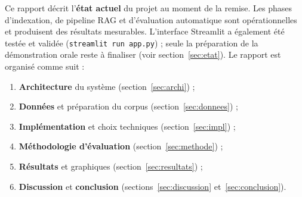 Ce rapport d\'ecrit l'\textbf{\'etat actuel} du projet au moment de la remise. Les phases
d'indexation, de pipeline RAG et d'\'evaluation automatique sont op\'erationnelles et produisent
des r\'esultats mesurables. L'interface Streamlit a \'egalement \'et\'e test\'ee et valid\'ee
(\texttt{streamlit run app.py}) ; seule la pr\'eparation de la d\'emonstration orale reste
\`a finaliser (voir section~\ref{sec:etat}). Le rapport est organis\'e comme suit :
\begin{enumerate}[noitemsep]
  \item \textbf{Architecture} du syst\`eme (section~\ref{sec:archi}) ;
  \item \textbf{Donn\'ees} et pr\'eparation du corpus (section~\ref{sec:donnees}) ;
  \item \textbf{Impl\'ementation} et choix techniques (section~\ref{sec:impl}) ;
  \item \textbf{M\'ethodologie d'\'evaluation} (section~\ref{sec:methode}) ;
  \item \textbf{R\'esultats} et graphiques (section~\ref{sec:resultats}) ;
  \item \textbf{Discussion} et \textbf{conclusion} (sections~\ref{sec:discussion}
        et~\ref{sec:conclusion}).
\end{enumerate}
